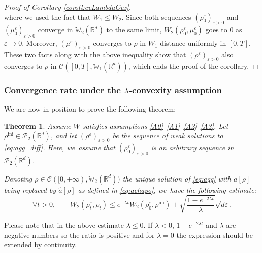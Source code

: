 \documentclass[11pt]{article}
\numberwithin{equation}{section}
\newcommand{\ini}{\mathrm{ini}}
\def\RR{\mathbb{R}}
\def\WW{\mathbb{W}}
\def\eps{\varepsilon}
\def\calC{{\mathcal C}}
\def\calP{{\mathcal P}}
\def\achapo{\widehat{a}}
\theoremstyle{plain}
\newtheorem{theorem}{Theorem}[section]
\theoremstyle{definition}
\begin{document}
\begin{proof}[Proof of Corollary \ref{coroll:cvLambdaCvx}]
\[\]
where we used the fact that $W_1 \leq W_2$. Since both sequences $(\rho_0^\eps)_{\eps>0}$ and $(\mu_0^\eps)_{\eps>0}$ converge in $\WW_2(\RR^d)$ to the same limit, $W_2(\rho_0^\eps, \mu_0^\eps)$ goes to 0 as $\eps \to 0$. Moreover, $(\mu^\eps)_{\eps>0}$ converges to $\rho$ in $W_1$ distance uniformly in $[0,T]$. These two facts along with the above inequality show that $(\rho^\eps)_{\eps>0}$ also converges to $\rho$ in $\calC([0,T], \WW_1(\RR^d))$, which ends the proof of the corollary.
\end{proof}

\subsubsection{Convergence rate under the $\lambda$-convexity assumption}

We are now in position to prove the following theorem:
\begin{theorem}\label{thm:cvOrder1/2}
Assume $W$ satisfies assumptions \eqref{A0}--\eqref{A1}--\eqref{A2}--\eqref{A3}. Let $\rho^{\ini} \in \calP_2(\RR^d)$, and let $(\rho^\eps)_{\eps > 0}$ be the sequence of weak solutions to \eqref{eq:agg_diff}. Here, we~assume that $(\rho_0^\eps)_{\eps >0}$ is an arbitrary sequence in $\calP_2(\RR^d)$.

Denoting $\rho \in \calC([0,+\infty), \WW _2(\RR^d))$ the unique solution of \eqref{eq:agg} with $a[\rho]$ being replaced by $\achapo[\rho]$ as defined in \eqref{eq:achapo}, we~have the following estimate:
\begin{equation}\label{ineq:cvgRateLambdaCvx}
\forall t>0, \qquad
W_2(\rho_t^\eps, \rho_t) \leq e^{-\lambda t} W_2(\rho_0^\eps, \rho^{\ini}) + \sqrt{\frac{1 - e^{-2\lambda t}}{\lambda}} \sqrt{d\eps}.
\end{equation}
\end{theorem}
Please note that in the above estimate $\lambda \leq 0$. If $\lambda < 0$, $1 - e^{-2\lambda t}$ and $\lambda$ are negative numbers so the ratio is positive and for $\lambda=0$ the expression should be extended by continuity.
\end{document}
